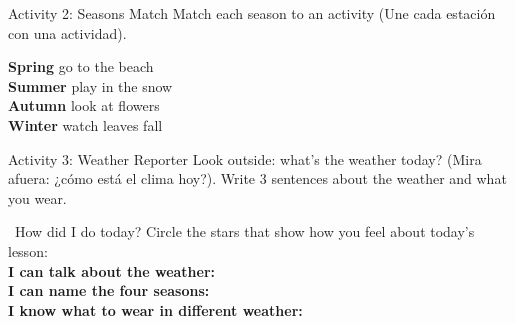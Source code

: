 \begin{activity}{Activity 2: Seasons Match }
  Match each season to an activity (Une cada estación con una actividad).
  
  \textbf{Spring} \hspace{2cm} go to the beach\\
  \textbf{Summer} \hspace{2cm} play in the snow\\
  \textbf{Autumn} \hspace{2cm} look at flowers\\
  \textbf{Winter} \hspace{2cm} watch leaves fall
\end{activity}

\begin{activity}{Activity 3: Weather Reporter }
  Look outside: what's the weather today? (Mira afuera: ¿cómo está el clima hoy?). Write 3 sentences about the weather and what you wear.
  \writinglines[3]
\end{activity}

\vspace{1em}
\begin{grammartip}{ \ How did I do today?}
  Circle the stars that show how you feel about today's lesson:\\[6pt]
  \textbf{I can talk about the weather:} \selfcheck[0] \\[4pt]
  \textbf{I can name the four seasons:} \selfcheck[0] \\[4pt]
  \textbf{I know what to wear in different weather:} \selfcheck[0]
\end{grammartip}
